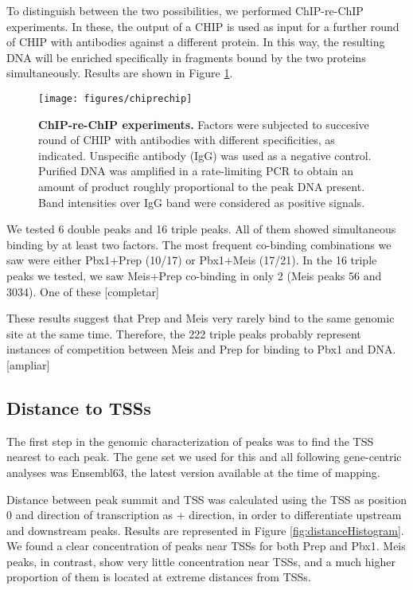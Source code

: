 To distinguish between the two possibilities, we performed ChIP-re-ChIP experiments. In these, the output of a \ac{CHIP} is used as input for a further round of \ac{CHIP} with antibodies against a different protein. In this way, the resulting DNA will be enriched specifically in fragments bound by the two proteins simultaneously. Results are shown in Figure \ref{fig:chiprechip}.

\begin{figure}[]
  
  \centering
  \label{fig:chiprechip}
  \texttt{[image: figures/chiprechip]}
  \caption[ChIP-re-ChIP experiments]{\textbf{ChIP-re-ChIP experiments.} Factors were subjected to succesive round of \ac{CHIP} with antibodies with different specificities, as indicated. Unspecific antibody (IgG) was used as a negative control. Purified DNA was amplified in a rate-limiting \ac{PCR} to obtain an amount of product roughly proportional to the peak DNA present. Band intensities over IgG band were considered as positive signals.}
\end{figure}

We tested 6 double peaks and 16 triple peaks. All of them showed simultaneous binding by at least two factors. The most frequent co-binding combinations we saw were either Pbx1+Prep (10/17) or Pbx1+Meis (17/21). In the 16 triple peaks we tested, we saw Meis+Prep co-binding in only 2 (Meis peaks 56 and 3034). One of these [completar]

These results suggest that Prep and Meis very rarely bind to the same genomic site at the same time. Therefore, the 222 triple peaks probably represent instances of competition between Meis and Prep for binding to Pbx1 and DNA. [ampliar]


\subsection{Distance to TSSs}

The first step in the genomic characterization of peaks was to find the \ac{TSS} nearest to each peak. The gene set we used for this and all following gene-centric analyses was Ensembl63, the latest version available at the time of mapping.

Distance between peak summit and \ac{TSS} was calculated using the \ac{TSS} as position 0 and direction of transcription as + direction, in order to differentiate upstream and downstream peaks. Results are represented in Figure \ref{fig:distanceHistogram}. We found a clear concentration of peaks near \ac{TSS}s for both Prep and Pbx1. Meis peaks, in contrast, show very little concentration near \ac{TSS}s, and a much higher proportion of them is located at extreme distances from \ac{TSS}s. 

